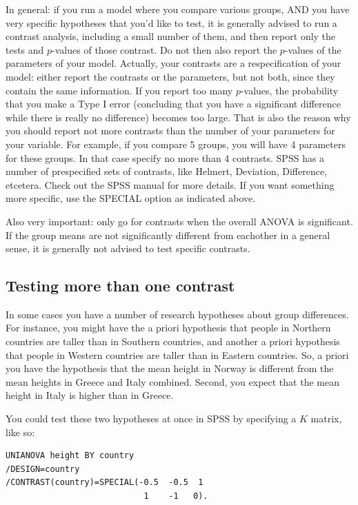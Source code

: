\documentclass[]{report}\usepackage[]{graphicx}\usepackage[]{color}
\begin{document}
In general: if you run a model where you compare various groups, AND you have very specific hypotheses that you'd like to test, it is generally advised to run a contrast analysis, including a small number of them, and then report only the tests and $p$-values of those contrast. Do not then also report the $p$-values of the parameters of your model. Actually, your contrasts are a respecification of your model: either report the contrasts or the parameters, but not both, since they contain the same information. If you report too many $p$-values, the probability that you make a Type I error (concluding that you have a significant difference while there is really no difference) becomes too large. That is also the reason why you should report not more contrasts than the number of your parameters for your variable. For example, if you compare 5 groups, you will have 4 parameters for these groups. In that case specify no more than 4 contrasts. SPSS has a number of prespecified sets of contrasts, like Helmert, Deviation, Difference, etcetera. Check out the SPSS manual for more details. If you want something more specific, use the SPECIAL option as indicated above. 

Also very important: only go for contrasts when the overall ANOVA is significant. If the group means are not significantly different from eachother in a general sense, it is generally not advised to test specific contrasts.

\subsection{Testing more than one contrast}

In some cases you have a number of research hypotheses about group differences. For instance, you might have the a priori hypothesis that people in Northern countries are taller than in Southern countries, and another a priori hypothesis that people in Western countries are taller than in Eastern countries. So, a priori you have the hypothesis that the mean height in Norway is different from the mean heights in Greece and Italy combined. Second, you expect that the mean height in Italy is higher than in Greece.

You could test these two hypotheses at once in SPSS by specifying a $K$ matrix, like so:

\begin{verbatim}
UNIANOVA height BY country
/DESIGN=country
/CONTRAST(country)=SPECIAL(-0.5  -0.5  1
                            1    -1   0).
\end{verbatim}
\end{document}
